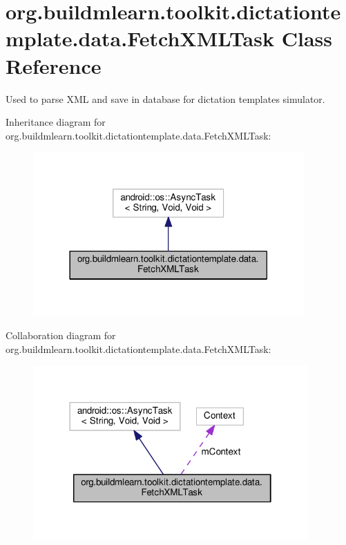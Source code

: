\hypertarget{classorg_1_1buildmlearn_1_1toolkit_1_1dictationtemplate_1_1data_1_1FetchXMLTask}{}\section{org.\+buildmlearn.\+toolkit.\+dictationtemplate.\+data.\+Fetch\+X\+M\+L\+Task Class Reference}
\label{classorg_1_1buildmlearn_1_1toolkit_1_1dictationtemplate_1_1data_1_1FetchXMLTask}


Used to parse X\+ML and save in database for dictation template\textquotesingle{}s simulator.  




Inheritance diagram for org.\+buildmlearn.\+toolkit.\+dictationtemplate.\+data.\+Fetch\+X\+M\+L\+Task\+:
\nopagebreak
\begin{figure}[H]
\begin{center}
\leavevmode
\includegraphics[width=294pt]{classorg_1_1buildmlearn_1_1toolkit_1_1dictationtemplate_1_1data_1_1FetchXMLTask__inherit__graph}
\end{center}
\end{figure}


Collaboration diagram for org.\+buildmlearn.\+toolkit.\+dictationtemplate.\+data.\+Fetch\+X\+M\+L\+Task\+:
\nopagebreak
\begin{figure}[H]
\begin{center}
\leavevmode
\includegraphics[width=298pt]{classorg_1_1buildmlearn_1_1toolkit_1_1dictationtemplate_1_1data_1_1FetchXMLTask__coll__graph}
\end{center}
\end{figure}
